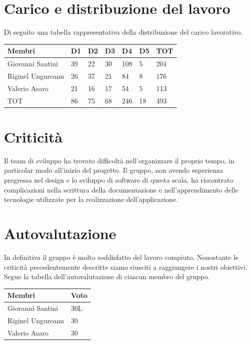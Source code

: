 \documentclass{report}
\begin{document}
\section{Carico e distribuzione del lavoro}
Di seguito una tabella rappresentativa della distribuzione del carico lavorativo.
\begin{center} %
	\centering
	\begin{tabular}{ |p{3cm}|p{1cm}|p{1cm}|p{1cm}|p{1cm}|p{1cm}|p{1cm}|  }
		\hline
		\centering  Membri  &  D1 &  D2 & D3 & D4 & D5 & TOT\\ %
		\hline
		\centering Giovanni Santini & 39 & 22 & 30 & 108 & 5 & 204 \\ %
		\hline
		\centering Riginel Ungureanu & 26 & 37 & 21 & 84 & 8 & 176 \\ %
		\hline
		\centering Valerio Asaro & 21 & 16 & 17 & 54 & 5 & 113 \\ %
		\hline
		\centering TOT & 86 & 75 & 68 & 246 & 18 & 493 \\ %
		\hline
	\end{tabular}
\end{center}

\section{Criticità}
Il team di sviluppo ha trovato difficoltà nell'organizzare il proprio tempo, in particolar modo all'inizio del progetto. Il gruppo, non avendo esperienza pregressa nel design e lo sviluppo di software di questa scala, ha riscontrato complicazioni nella scrittura della documentazione e nell'apprendimento delle tecnologie utilizzate per la realizzazione dell'applicazione.

\section{Autovalutazione}
In definitiva il gruppo è molto soddisfatto del lavoro compiuto. Nonostante le criticità precedentemente descritte siamo riusciti a raggiungere i nostri obiettivi.
Segue la tabella dell'autovalutazione di ciascun membro del gruppo.
\begin{center} %
	\centering
	\begin{tabular}{ |p{3cm}|p{1cm}|  }
		\hline
		\centering  Membri  & Voto\\ %
		\hline
		\centering Giovanni Santini & 30L \\%
		\hline
		\centering Riginel Ungureanu & 30  \\%
		\hline
		\centering Valerio Asaro & 30  \\%
		\hline
	\end{tabular}
\end{center}



	
\end{document}
